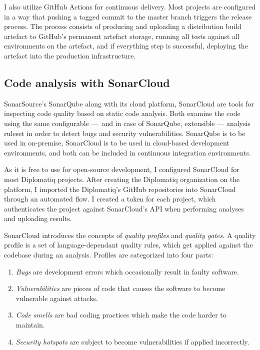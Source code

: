 I also utilize GitHub Actions for continuous delivery. Most projects are configured in a way that pushing a tagged commit to the master branch triggers the release process. The process consists of producing and uploading a distribution build artefact to GitHub's permanent artefact storage, running all tests against all environments on the artefact, and if everything step is successful, deploying the artefact into the production infrastructure.

\subsection{Code analysis with SonarCloud}

SonarSource's SonarQube along with its cloud platform, SonarCloud are tools for inspecting code quality based on static code analysis. Both examine the code using the same configurable — and in case of SonarQube, extensible — analysis ruleset in order to detect bugs and security vulnerabilities. SonarQube is to be used in on-premise, SonarCloud is to be used in cloud-based development environments, and both can be included in continuous integration environments.

As it is free to use for open-source development, I configured SonarCloud for most Diplomatiq projects. After creating the Diplomatiq organization on the platform, I imported the Diplomatiq's GitHub repositories into SonarCloud through an automated flow. I created a token for each project, which authenticates the project against SonarCloud's API when performing analyses and uploading results.

SonarCloud introduces the concepts of \emph{quality profiles} and \emph{quality gates}. A quality profile is a set of language-dependant quality rules, which get applied against the codebase during an analysis. Profiles are categorized into four parts:

\begin{enumerate}
\item \emph{Bugs} are development errors which occasionally result in faulty software.
\item \emph{Vulnerabilities} are pieces of code that causes the software to become vulnerable against attacks.
\item \emph{Code smells} are bad coding practices which make the code harder to maintain.
\item \emph{Security hotspots} are subject to become vulnerabilities if applied incorrectly.
\end{enumerate}

